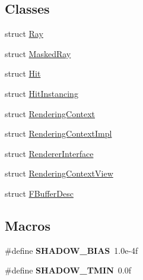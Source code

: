 \subsection*{Classes}
\begin{DoxyCompactItemize}
\item 
struct \hyperlink{struct_ray}{Ray}
\item 
struct \hyperlink{struct_masked_ray}{Masked\+Ray}
\item 
struct \hyperlink{struct_hit}{Hit}
\item 
struct \hyperlink{struct_hit_instancing}{Hit\+Instancing}
\item 
struct \hyperlink{struct_rendering_context}{Rendering\+Context}
\item 
struct \hyperlink{struct_rendering_context_impl}{Rendering\+Context\+Impl}
\item 
struct \hyperlink{struct_renderer_interface}{Renderer\+Interface}
\item 
struct \hyperlink{struct_rendering_context_view}{Rendering\+Context\+View}
\item 
struct \hyperlink{struct_f_buffer_desc}{F\+Buffer\+Desc}
\end{DoxyCompactItemize}
\subsection*{Macros}
\begin{DoxyCompactItemize}
\item 
\mbox{\label{group___fermat_ga358c09f983ea18262d1fd3410d4b3ddb}} 
\#define {\bfseries S\+H\+A\+D\+O\+W\+\_\+\+B\+I\+AS}~1.\+0e-\/4f
\item 
\mbox{\label{group___fermat_ga32be64d7300651da16f30997ac20d2d5}} 
\#define {\bfseries S\+H\+A\+D\+O\+W\+\_\+\+T\+M\+IN}~0.\+0f
\end{DoxyCompactItemize}
